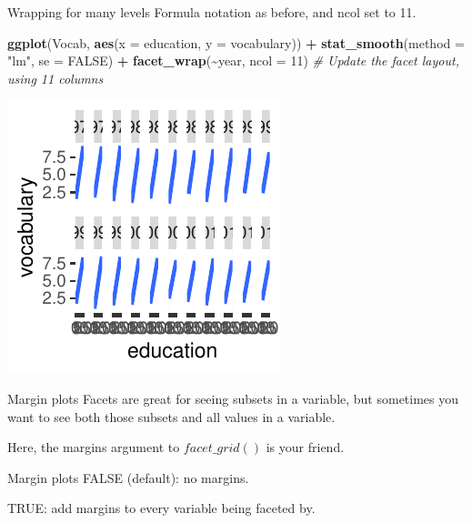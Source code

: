 \documentclass[
  ignorenonframetext,
]{beamer}
\newenvironment{Shaded}{\begin{snugshade}}{\end{snugshade}}
\newcommand{\AttributeTok}[1]{\textcolor[rgb]{0.13,0.29,0.53}{#1}}
\newcommand{\CommentTok}[1]{\textcolor[rgb]{0.56,0.35,0.01}{\textit{#1}}}
\newcommand{\ConstantTok}[1]{\textcolor[rgb]{0.56,0.35,0.01}{#1}}
\newcommand{\DecValTok}[1]{\textcolor[rgb]{0.00,0.00,0.81}{#1}}
\newcommand{\FunctionTok}[1]{\textcolor[rgb]{0.13,0.29,0.53}{\textbf{#1}}}
\newcommand{\NormalTok}[1]{#1}
\newcommand{\SpecialCharTok}[1]{\textcolor[rgb]{0.81,0.36,0.00}{\textbf{#1}}}
\newcommand{\StringTok}[1]{\textcolor[rgb]{0.31,0.60,0.02}{#1}}
\begin{document}
\begin{frame}[fragile]{Wrapping for many levels}
\label{wrapping-for-many-levels-7}
Formula notation as before, and ncol set to 11.


\begin{Shaded}
\begin{Highlighting}[]
\FunctionTok{ggplot}\NormalTok{(Vocab, }\FunctionTok{aes}\NormalTok{(}\AttributeTok{x =}\NormalTok{ education, }\AttributeTok{y =}\NormalTok{ vocabulary)) }\SpecialCharTok{+} \FunctionTok{stat\_smooth}\NormalTok{(}\AttributeTok{method =} \StringTok{"lm"}\NormalTok{,}
    \AttributeTok{se =} \ConstantTok{FALSE}\NormalTok{) }\SpecialCharTok{+} \FunctionTok{facet\_wrap}\NormalTok{(}\SpecialCharTok{\textasciitilde{}}\NormalTok{year, }\AttributeTok{ncol =} \DecValTok{11}\NormalTok{)  }\CommentTok{\# Update the facet layout, using 11 columns}
\end{Highlighting}
\end{Shaded}

\begin{center}\includegraphics[width=0.5\linewidth]{Figs/unnamed-chunk-97-1} \end{center}
\end{frame}

\begin{frame}{Margin plots}
\label{margin-plots}
Facets are great for seeing subsets in a variable, but sometimes you
want to see both those subsets and all values in a variable.

Here, the margins argument to \(facet\_grid()\) is your friend.
\end{frame}

\begin{frame}{Margin plots}
\label{margin-plots-1}
FALSE (default): no margins.

TRUE: add margins to every variable being faceted by.
\end{frame}
\end{document}
